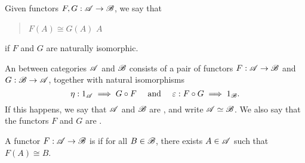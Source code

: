\begin{definition}
    Given functors $F, G:\mathscr A\to\mathscr B$, we say that
    \begin{quote}
        \begin{center}
        $F(A)\cong G(A)$  $A$
        \end{center}
    \end{quote}
    if $F$ and $G$ are naturally isomorphic.
\end{definition}

\begin{definition}
    An  between categories $\mathscr A$ and $\mathscr B$ consists of a pair of functors $F:\mathscr A\to\mathscr B$ and $G:\mathscr B\to\mathscr A$, together with natural isomorphisms
    \begin{equation*}
        \eta: 1_{\mathscr A}\implies G\circ F\quad\text{ and }\quad\varepsilon: F\circ G\implies 1_{\mathscr B}.
    \end{equation*}
    If this happens, we say that $\mathscr A$ and $\mathscr B$ are , and write $\mathscr A\simeq\mathscr B$. We also say that the functors $F$ and $G$ are .
\end{definition}

\begin{definition}
    A functor $F:\mathscr A\to\mathscr B$ is  if for all $B\in\mathscr B$, there exists $A\in\mathscr A$ such that $F(A)\cong B$.
\end{definition}

